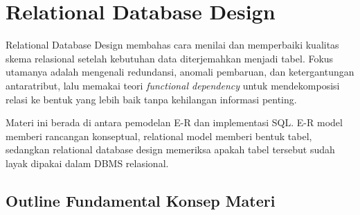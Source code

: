 \section{Relational Database Design}

Relational Database Design membahas cara menilai dan memperbaiki kualitas skema relasional setelah kebutuhan data diterjemahkan menjadi tabel. Fokus utamanya adalah mengenali redundansi, anomali pembaruan, dan ketergantungan antaratribut, lalu memakai teori \textit{functional dependency} untuk mendekomposisi relasi ke bentuk yang lebih baik tanpa kehilangan informasi penting.

Materi ini berada di antara pemodelan E-R dan implementasi SQL. E-R model memberi rancangan konseptual, relational model memberi bentuk tabel, sedangkan relational database design memeriksa apakah tabel tersebut sudah layak dipakai dalam DBMS relasional.

\subsection{Outline Fundamental Konsep Materi}

